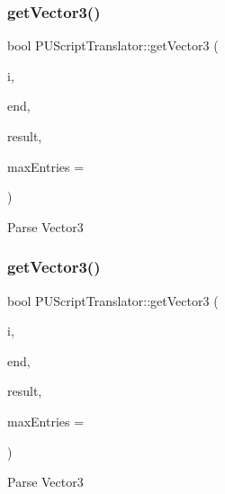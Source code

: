 \subsubsection{\texorpdfstring{get\+Vector3()}{getVector3()}\hspace{0.1cm}{\footnotesize\ttfamily [1/2]}}
{\footnotesize\ttfamily bool P\+U\+Script\+Translator\+::get\+Vector3 (\begin{DoxyParamCaption}\item[{P\+U\+Abstract\+Node\+List\+::const\+\_\+iterator}]{i,  }\item[{P\+U\+Abstract\+Node\+List\+::const\+\_\+iterator}]{end,  }\item[{\hyperlink{classVec3}{Vec3} $\ast$}]{result,  }\item[{int}]{max\+Entries = {} }\end{DoxyParamCaption})}

Parse Vector3 \mbox{\label{classPUScriptTranslator_a3362c25448c91a55aca1114c69ddbc97}} 
\subsubsection{\texorpdfstring{get\+Vector3()}{getVector3()}\hspace{0.1cm}{\footnotesize\ttfamily [2/2]}}
{\footnotesize\ttfamily bool P\+U\+Script\+Translator\+::get\+Vector3 (\begin{DoxyParamCaption}\item[{P\+U\+Abstract\+Node\+List\+::const\+\_\+iterator}]{i,  }\item[{P\+U\+Abstract\+Node\+List\+::const\+\_\+iterator}]{end,  }\item[{\hyperlink{classVec3}{Vec3} $\ast$}]{result,  }\item[{int}]{max\+Entries = {} }\end{DoxyParamCaption})}

Parse Vector3 \mbox{\label{classPUScriptTranslator_a322d97ac1f6308ea0dda66b5b1c8b793}} 
